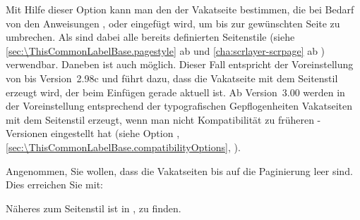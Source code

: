 \begin{Declaration}
\end{Declaration}%
Mit Hilfe dieser Option%
kann man den  der Vakatseite bestimmen, die bei Bedarf von
den Anweisungen ,
 oder
 eingefügt wird, um bis zur
gewünschten Seite zu umbrechen. Als  sind dabei alle bereits
definierten Seitenstile (siehe \autoref{sec:\ThisCommonLabelBase.pagestyle} ab
 und
\autoref{cha:scrlayer-scrpage} ab )
verwendbar. Daneben ist auch 
möglich. Dieser Fall entspricht der Voreinstellung von \KOMAScript{} bis
Version~2.98c und führt dazu, dass die Vakatseite mit dem Seitenstil erzeugt
wird, der beim Einfügen gerade aktuell ist. Ab Version~3.00%
werden in der Voreinstellung entsprechend der
typografischen Gepflogenheiten Vakatseiten mit dem Seitenstil
erzeugt, wenn man nicht Kompatibilität zu früheren \KOMAScript-Versionen
eingestellt hat (siehe Option %
,
\autoref{sec:\ThisCommonLabelBase.compatibilityOptions},
).
  \begin{Example}
    Angenommen, Sie wollen, dass die Vakatseiten bis auf die Paginierung leer
    sind. Dies erreichen Sie mit:
\begin{lstcode}
\end{lstcode}
    Näheres zum Seitenstil 
    ist in 
    ,
     zu finden.
  \end{Example}
